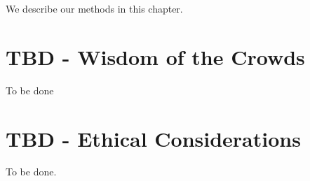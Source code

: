\documentclass[]{tufte-book}
\theoremstyle{definition}
\theoremstyle{definition}
\theoremstyle{definition}
\theoremstyle{remark}
\begin{document}
We describe our methods in this chapter.

\hypertarget{tbd---wisdom-of-the-crowds}{%
\chapter{TBD - Wisdom of the Crowds}\label{tbd---wisdom-of-the-crowds}}

To be done

\hypertarget{tbd---ethical-considerations}{%
\chapter{TBD - Ethical Considerations}\label{tbd---ethical-considerations}}

To be done.


\end{document}
